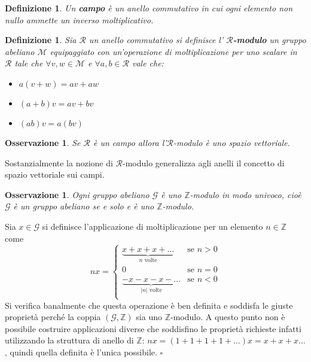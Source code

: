 \documentclass[10pt, twoside=false, x11names]{scrbook}
\newtheorem{osservation}[theorem]{Osservazione}
\newtheorem{definition}[theorem]{Definizione}
\newenvironment{proof}{{\textbf{Dimostrazione}:}}{\hfill $\square$}
\newcommand{\R}{\mathcal{R}}
\newcommand{\M}{\mathcal{M}}
\newcommand{\Z}{\mathbb{Z}}
\begin{document}
\begin{definition}
  Un \textbf{campo}  è un anello commutativo in cui ogni elemento non nullo ammette
  un inverso moltiplicativo.
\end{definition}

\begin{definition}
  Sia $ \R $ un anello commutativo si definisce l' \textbf{$ \R $-modulo} \index{$ \R $-modulo}
  un gruppo abeliano $ \M $ equipaggiato con un'operazione di moltiplicazione per uno scalare in $ \R $
  tale che $ \forall v,w \in \M $ e $ \forall a,b \in \R $ vale che:
  \begin{itemize}
  \item $ a(v + w) = av + aw $
  \item $ (a + b)v = av + bv $
  \item $ (ab)v = a(bv) $
  \end{itemize}
\end{definition}

\begin{osservation}
  Se $ \R $ è un campo allora l'$ \R $-modulo è uno spazio vettoriale.
\end{osservation}
Sostanzialmente la nozione di $ \R $-modulo generalizza agli anelli il concetto di spazio vettoriale sui campi.

\begin{osservation}
  Ogni gruppo abeliano $ \mathcal{G} $ è uno $ \Z $-modulo in modo univoco, cioè $ \mathcal{G} $ è un
  gruppo abeliano se e solo e è uno $ \Z $-modulo.
\end{osservation}
\begin{proof}
  Sia $ x \in \mathcal{G} $ si definisce l'applicazione di moltiplicazione per un elemento $ n \in \Z $ come
  \[
    nx =
    \begin{cases}
      \underbrace{ x + x + x + \dots}_{n \text{ volte}} & \text{se } n > 0 \\
      0 & \text{se } n = 0 \\
       \underbrace{ - x - x - x - \dots}_{|n| \text{ volte}} & \text{se } n < 0 \\
    \end{cases}
  \]
  Si verifica banalmente che questa operazione è ben definita e soddisfa
  le giuste proprietà perché la coppia $ (\mathcal{G}, \Z) $ sia uno $ \Z $-modulo.
  A questo punto non è possibile costruire applicazioni diverse che soddisfino le
  proprietà richieste infatti utilizzando la struttura di anello di $ \Z $:
  $ n x = (1 + 1 + 1 + 1 + \dots) x = x + x + x \dots $, quindi quella definita
  è l'unica possibile.
\end{proof}
\end{document}
